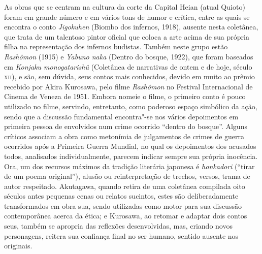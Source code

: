As obras que se centram na cultura da corte da Capital Heian (atual
Quioto) foram em grande número e em vários tons de humor e crítica,
entre as quais se encontra o conto \textit{Jigokuhen} 
(Biombo dos infernos, 1918), ausente nesta coletânea, que trata de um
talentoso pintor oficial que coloca a arte acima de sua própria filha
na representação dos infernos budistas. Também neste grupo estão
\textit{Rashômon} (1915) e \textit{Yabuno naka} (Dentro do bosque, 1922), 
que foram baseados em \textit{Konjaku monogatarishû} 
(Coletânea de narrativas de ontem e de hoje, século \textsc{xii}), e são, sem
dúvida, seus contos mais conhecidos, devido em muito ao prêmio recebido
por Akira Kurosawa, pelo filme \textit{Rashômon} no Festival
Internacional de Cinema de Veneza de 1951. Embora nomeie o filme, o
primeiro conto é pouco utilizado no filme, servindo, entretanto, como
poderoso espaço simbólico da ação, sendo que a discussão fundamental
encontra"-se nos vários depoimentos em primeira pessoa de envolvidos num
crime ocorrido ``dentro do bosque''. Alguns críticos associam a obra como
metonímia de julgamentos de crimes de guerra ocorridos após a Primeira
Guerra Mundial, no qual os depoimentos dos acusados todos, analisados
individualmente, parecem indicar sempre sua própria inocência. Ora, um
dos recursos máximos da tradição literária japonesa é \textit{honkadori} 
(``tirar de um poema original''), alusão ou reinterpretação de trechos,
versos, trama de autor respeitado. Akutagawa, quando retira de uma
coletânea compilada oito séculos antes pequenas cenas ou relatos
sucintos, estes são deliberadamente transformados em obra sua, sendo 
utilizadas como motor para sua discussão contemporânea acerca da ética;
e Kurosawa, ao retomar e adaptar dois contos seus, também se apropria
das reflexões desenvolvidas, mas, criando novos personagens, reitera
sua confiança final no ser humano, sentido ausente nos originais.

